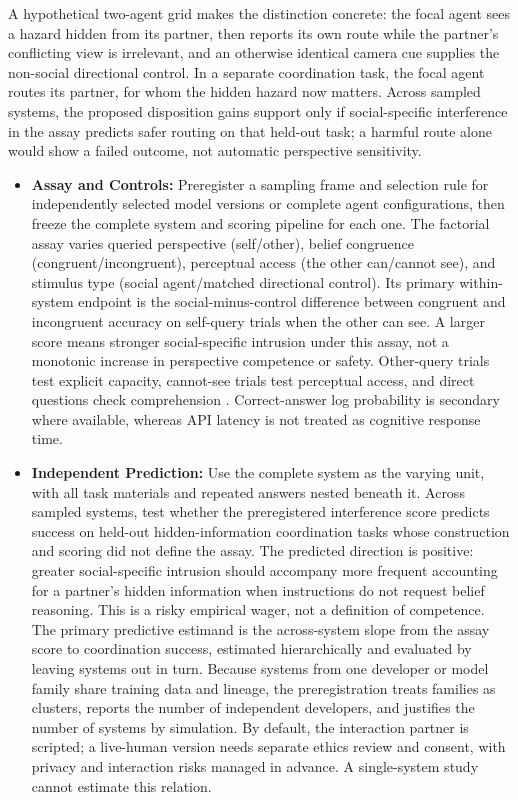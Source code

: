 \documentclass{article}
\begin{document}
A hypothetical two-agent grid makes the distinction concrete: the focal agent sees a hazard hidden from its partner, then reports its own route while the partner's conflicting view is irrelevant, and an otherwise identical camera cue supplies the non-social directional control. In a separate coordination task, the focal agent routes its partner, for whom the hidden hazard now matters. Across sampled systems, the proposed disposition gains support only if social-specific interference in the assay predicts safer routing on that held-out task; a harmful route alone would show a failed outcome, not automatic perspective sensitivity.
\begin{itemize}
    \item \textbf{Assay and Controls:} Preregister a sampling frame and selection rule for independently selected model versions or complete agent configurations, then freeze the complete system and scoring pipeline for each one. The factorial assay varies queried perspective (self/other), belief congruence (congruent/incongruent), perceptual access (the other can/cannot see), and stimulus type (social agent/matched directional control). Its primary within-system endpoint is the social-minus-control difference between congruent and incongruent accuracy on self-query trials when the other can see. A larger score means stronger social-specific intrusion under this assay, not a monotonic increase in perspective competence or safety. Other-query trials test explicit capacity, cannot-see trials test perceptual access, and direct questions check comprehension \citep{ref53, ref66, ref68}. Correct-answer log probability is secondary where available, whereas API latency is not treated as cognitive response time.
    \item \textbf{Independent Prediction:} Use the complete system as the varying unit, with all task materials and repeated answers nested beneath it. Across sampled systems, test whether the preregistered interference score predicts success on held-out hidden-information coordination tasks whose construction and scoring did not define the assay. The predicted direction is positive: greater social-specific intrusion should accompany more frequent accounting for a partner's hidden information when instructions do not request belief reasoning. This is a risky empirical wager, not a definition of competence. The primary predictive estimand is the across-system slope from the assay score to coordination success, estimated hierarchically and evaluated by leaving systems out in turn. Because systems from one developer or model family share training data and lineage, the preregistration treats families as clusters, reports the number of independent developers, and justifies the number of systems by simulation. By default, the interaction partner is scripted; a live-human version needs separate ethics review and consent, with privacy and interaction risks managed in advance. A single-system study cannot estimate this relation.

\end{itemize}
\end{document}
